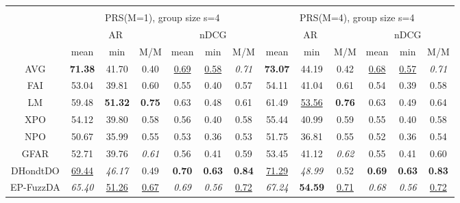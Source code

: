 \begin{tabular}{ c | c c c | c c c || c c c | c c c}
\multicolumn{12}{c}{} \\
\multicolumn{1}{c}{} & \multicolumn{6}{c}{PRS(M=1), group size s=4} & \multicolumn{6}{c}{PRS(M=4), group size s=4} \\
\multicolumn{1}{c}{} & \multicolumn{3}{c}{AR} & \multicolumn{3}{c}{nDCG} & \multicolumn{3}{c}{AR} & \multicolumn{3}{c}{nDCG} \\
& mean & min & M/M & mean & min & M/M & mean & min & M/M & mean & min & M/M \\
\hline
AVG & \textbf{71.38} & 41.70 & 0.40 & \underline{0.69} & \underline{0.58} & \textit{0.71} & \textbf{73.07} & 44.19 & 0.42 & \underline{0.68} & \underline{0.57} & \textit{0.71} \\
FAI & 53.04 & 39.81 & 0.60 & 0.55 & 0.40 & 0.57 & 54.11 & 41.04 & 0.61 & 0.54 & 0.39 & 0.58 \\
LM & 59.48 & \textbf{51.32} & \textbf{0.75} & 0.63 & 0.48 & 0.61 & 61.49 & \underline{53.56} & \textbf{0.76} & 0.63 & 0.49 & 0.64 \\
XPO & 54.12 & 39.80 & 0.58 & 0.56 & 0.40 & 0.58 & 55.44 & 40.99 & 0.59 & 0.55 & 0.40 & 0.58 \\
NPO & 50.67 & 35.99 & 0.55 & 0.53 & 0.36 & 0.53 & 51.75 & 36.81 & 0.55 & 0.52 & 0.36 & 0.54 \\
GFAR & 52.71 & 39.76 & \textit{0.61} & 0.56 & 0.41 & 0.59 & 53.45 & 41.12 & \textit{0.62} & 0.55 & 0.41 & 0.60 \\
DHondtDO & \underline{69.44} & \textit{46.17} & 0.49 & \textbf{0.70} & \textbf{0.63} & \textbf{0.84} & \underline{71.29} & \textit{48.99} & 0.52 & \textbf{0.69} & \textbf{0.63} & \textbf{0.83} \\
EP-FuzzDA & \textit{65.40} & \underline{51.26} & \underline{0.67} & \textit{0.69} & \textit{0.56} & \underline{0.72} & \textit{67.24} & \textbf{54.59} & \underline{0.71} & \textit{0.68} & \textit{0.56} & \underline{0.72} \\


\end{tabular}
